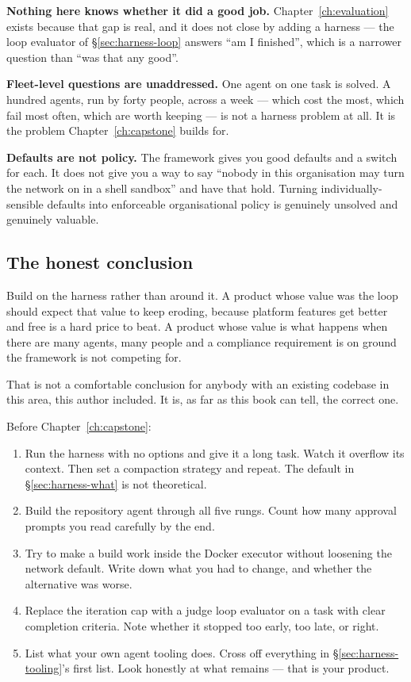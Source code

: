 \textbf{Nothing here knows whether it did a good job.}
Chapter~\ref{ch:evaluation} exists because that gap is real, and it does not
close by adding a harness --- the loop evaluator of \S\ref{sec:harness-loop}
answers ``am I finished'', which is a narrower question than ``was that any
good''.

\textbf{Fleet-level questions are unaddressed.} One agent on one task is solved.
A hundred agents, run by forty people, across a week --- which cost the most,
which fail most often, which are worth keeping --- is not a harness problem at
all. It is the problem Chapter~\ref{ch:capstone} builds for.

\textbf{Defaults are not policy.} The framework gives you good defaults and a
switch for each. It does not give you a way to say ``nobody in this organisation
may turn the network on in a shell sandbox'' and have that hold. Turning
individually-sensible defaults into enforceable organisational policy is
genuinely unsolved and genuinely valuable.

\subsection{The honest conclusion}

Build on the harness rather than around it. A product whose value was the loop
should expect that value to keep eroding, because platform features get better
and free is a hard price to beat. A product whose value is what happens when
there are many agents, many people and a compliance requirement is on ground the
framework is not competing for.

That is not a comfortable conclusion for anybody with an existing codebase in
this area, this author included. It is, as far as this book can tell, the correct
one.

\begin{exercisebox}
Before Chapter~\ref{ch:capstone}:

\begin{enumerate}[leftmargin=1.4em]
\item Run the harness with no options and give it a long task. Watch it overflow
      its context. Then set a compaction strategy and repeat. The default in
      \S\ref{sec:harness-what} is not theoretical.
\item Build the repository agent through all five rungs. Count how many approval
      prompts you read carefully by the end.
\item Try to make a build work inside the Docker executor without loosening the
      network default. Write down what you had to change, and whether the
      alternative was worse.
\item Replace the iteration cap with a judge loop evaluator on a task with clear
      completion criteria. Note whether it stopped too early, too late, or right.
\item List what your own agent tooling does. Cross off everything in
      \S\ref{sec:harness-tooling}'s first list. Look honestly at what remains ---
      that is your product.
\end{enumerate}
\end{exercisebox}

